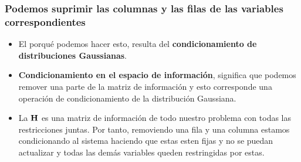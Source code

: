 \begin{frame}
    \frametitle{Podemos suprimir las columnas y las filas de las variables correspondientes}
    
    \begin{itemize}
        \item El porqué podemos hacer esto, resulta del {\bf condicionamiento de distribuciones Gaussianas}.
        \item {\bf Condicionamiento en el espacio de información}, significa que podemos remover una parte de la matriz de información y esto corresponde una operación de condicionamiento de la distribución Gaussiana.
        \item La $\boldsymbol{\mathbf{H}}$ es una matriz de información de todo nuestro problema con todas las restricciones juntas. Por tanto, removiendo una fila y una columna estamos condicionando al sistema haciendo que estas esten fijas y no se puedan actualizar y todas las demás variables queden restringidas por estas.
    \end{itemize}
   
    
\end{frame}


